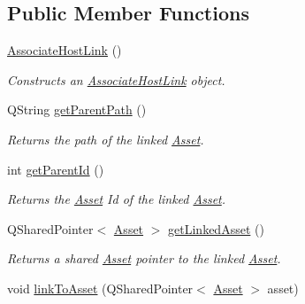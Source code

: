 \subsection*{Public Member Functions}
\begin{DoxyCompactItemize}
\item 
\hyperlink{class_picto_1_1_associate_host_link_a234b8a3478d3c3bf92e26466d42cfaff}{Associate\-Host\-Link} ()
\begin{DoxyCompactList}\small\item\em Constructs an \hyperlink{class_picto_1_1_associate_host_link}{Associate\-Host\-Link} object. \end{DoxyCompactList}\item 
Q\-String \hyperlink{class_picto_1_1_associate_host_link_a83d56fbbb10a481b1b144571eef58d24}{get\-Parent\-Path} ()
\begin{DoxyCompactList}\small\item\em Returns the path of the linked \hyperlink{class_picto_1_1_asset}{Asset}. \end{DoxyCompactList}\item 
\hypertarget{class_picto_1_1_associate_host_link_ad98e4984bd3baf057a65c075ecb019dc}{int \hyperlink{class_picto_1_1_associate_host_link_ad98e4984bd3baf057a65c075ecb019dc}{get\-Parent\-Id} ()}\label{class_picto_1_1_associate_host_link_ad98e4984bd3baf057a65c075ecb019dc}

\begin{DoxyCompactList}\small\item\em Returns the \hyperlink{class_picto_1_1_asset}{Asset} Id of the linked \hyperlink{class_picto_1_1_asset}{Asset}. \end{DoxyCompactList}\item 
\hypertarget{class_picto_1_1_associate_host_link_a33116a36842f2fe1b78c3af0b0d0986d}{Q\-Shared\-Pointer$<$ \hyperlink{class_picto_1_1_asset}{Asset} $>$ \hyperlink{class_picto_1_1_associate_host_link_a33116a36842f2fe1b78c3af0b0d0986d}{get\-Linked\-Asset} ()}\label{class_picto_1_1_associate_host_link_a33116a36842f2fe1b78c3af0b0d0986d}

\begin{DoxyCompactList}\small\item\em Returns a shared \hyperlink{class_picto_1_1_asset}{Asset} pointer to the linked \hyperlink{class_picto_1_1_asset}{Asset}. \end{DoxyCompactList}\item 
\hypertarget{class_picto_1_1_associate_host_link_ac4a7f2219f146ea54f0c4763ff1eb5e9}{void \hyperlink{class_picto_1_1_associate_host_link_ac4a7f2219f146ea54f0c4763ff1eb5e9}{link\-To\-Asset} (Q\-Shared\-Pointer$<$ \hyperlink{class_picto_1_1_asset}{Asset} $>$ asset)}\label{class_picto_1_1_associate_host_link_ac4a7f2219f146ea54f0c4763ff1eb5e9}


\end{DoxyCompactItemize}
